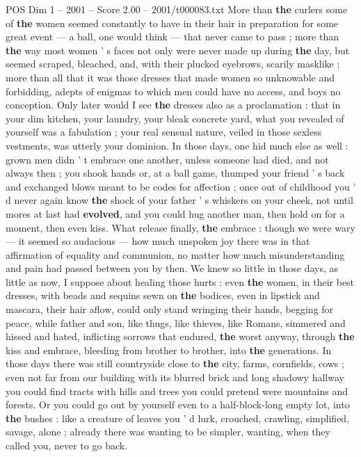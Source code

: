 \begin{textsample}{POS Dim 1 – 2001 – Score 2.00 – 2001/t000083.txt}
More than \textbf{the} curlers some of \textbf{the} women seemed constantly to have in their hair in preparation for some great event — a ball, one would think — that never came to pass ; more than \textbf{the} way most women ' s faces not only were never made up during \textbf{the} day, but seemed scraped, bleached, and, with their plucked eyebrows, scarily masklike ; more than all that it was those dresses that made women so unknowable and forbidding, adepts of enigmas to which men could have no access, and boys no conception.
Only later would I see \textbf{the} dresses also as a proclamation : that in your dim kitchen, your laundry, your bleak concrete yard, what you revealed of yourself was a fabulation ; your real sensual nature, veiled in those sexless vestments, was utterly your dominion.
In those days, one hid much else as well : grown men didn ' t embrace one another, unless someone had died, and not always then ; you shook hands or, at a ball game, thumped your friend ' s back and exchanged blows meant to be codes for affection ; once out of childhood you ' d never again know \textbf{the} shock of your father ' s whiskers on your cheek, not until mores at last had \textbf{evolved}, and you could hug another man, then hold on for a moment, then even kiss.
What release finally, \textbf{the} embrace : though we were wary — it seemed so audacious — how much unspoken joy there was in that affirmation of equality and communion, no matter how much misunderstanding and pain had passed between you by then.
We knew so little in those days, as little as now, I suppose about healing those hurts : even \textbf{the} women, in their best dresses, with beads and sequins sewn on \textbf{the} bodices, even in lipstick and mascara, their hair aflow, could only stand wringing their hands, begging for peace, while father and son, like thugs, like thieves, like Romans, simmered and hissed and hated, inflicting sorrows that endured, \textbf{the} worst anyway, through \textbf{the} kiss and embrace, bleeding from brother to brother, into \textbf{the} generations.
In those days there was still countryside close to \textbf{the} city, farms, cornfields, cows ; even not far from our building with its blurred brick and long shadowy hallway you could find tracts with hills and trees you could pretend were mountains and forests.
Or you could go out by yourself even to a half-block-long empty lot, into \textbf{the} bushes : like a creature of leaves you ' d lurk, crouched, crawling, simplified, savage, alone ; already there was wanting to be simpler, wanting, when they called you, never to go back.

\end{textsample}

